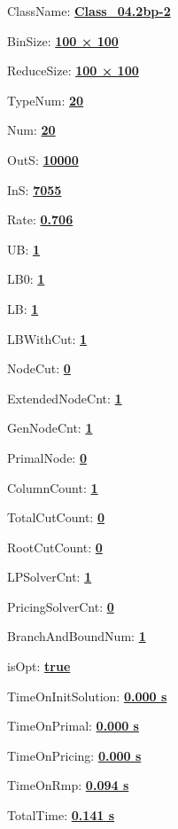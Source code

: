 \documentclass[11pt]{article}
\begin{document}
\pagestyle{empty}


ClassName: \underline{\textbf{Class_04.2bp-2}}
\par
BinSize: \underline{\textbf{100 × 100}}
\par
ReduceSize: \underline{\textbf{100 × 100}}
\par
TypeNum: \underline{\textbf{20}}
\par
Num: \underline{\textbf{20}}
\par
OutS: \underline{\textbf{10000}}
\par
InS: \underline{\textbf{7055}}
\par
Rate: \underline{\textbf{0.706}}
\par
UB: \underline{\textbf{1}}
\par
LB0: \underline{\textbf{1}}
\par
LB: \underline{\textbf{1}}
\par
LBWithCut: \underline{\textbf{1}}
\par
NodeCut: \underline{\textbf{0}}
\par
ExtendedNodeCnt: \underline{\textbf{1}}
\par
GenNodeCnt: \underline{\textbf{1}}
\par
PrimalNode: \underline{\textbf{0}}
\par
ColumnCount: \underline{\textbf{1}}
\par
TotalCutCount: \underline{\textbf{0}}
\par
RootCutCount: \underline{\textbf{0}}
\par
LPSolverCnt: \underline{\textbf{1}}
\par
PricingSolverCnt: \underline{\textbf{0}}
\par
BranchAndBoundNum: \underline{\textbf{1}}
\par
isOpt: \underline{\textbf{true}}
\par
TimeOnInitSolution: \underline{\textbf{0.000 s}}
\par
TimeOnPrimal: \underline{\textbf{0.000 s}}
\par
TimeOnPricing: \underline{\textbf{0.000 s}}
\par
TimeOnRmp: \underline{\textbf{0.094 s}}
\par
TotalTime: \underline{\textbf{0.141 s}}
\par
\newpage
\end{document}
